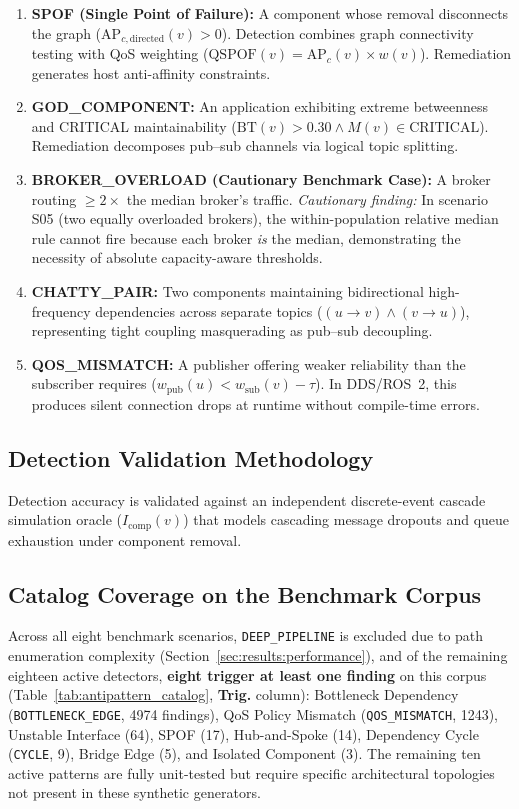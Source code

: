 \begin{enumerate}
    \item \textbf{SPOF (Single Point of Failure):} A component whose removal disconnects the graph ($\mathrm{AP}_{c,\text{directed}}(v) > 0$). Detection combines graph connectivity testing with QoS weighting ($\mathrm{QSPOF}(v) = \mathrm{AP}_c(v) \times w(v)$). Remediation generates host anti-affinity constraints.
    \item \textbf{GOD\_COMPONENT:} An application exhibiting extreme betweenness and CRITICAL maintainability ($\mathrm{BT}(v) > 0.30 \wedge M(v) \in \text{CRITICAL}$). Remediation decomposes pub--sub channels via logical topic splitting.
    \item \textbf{BROKER\_OVERLOAD (Cautionary Benchmark Case):} A broker routing $\ge 2\times$ the median broker's traffic. \emph{Cautionary finding:} In scenario S05 (two equally overloaded brokers), the within-population relative median rule cannot fire because each broker \emph{is} the median, demonstrating the necessity of absolute capacity-aware thresholds.
    \item \textbf{CHATTY\_PAIR:} Two components maintaining bidirectional high-frequency dependencies across separate topics ($(u \to v) \wedge (v \to u)$), representing tight coupling masquerading as pub--sub decoupling.
    \item \textbf{QOS\_MISMATCH:} A publisher offering weaker reliability than the subscriber requires ($w_{\text{pub}}(u) < w_{\text{sub}}(v) - \tau$). In DDS/ROS~2, this produces silent connection drops at runtime without compile-time errors.
\end{enumerate}

\subsection{Detection Validation Methodology}
\label{sec:catalog:validation}

Detection accuracy is validated against an independent discrete-event cascade simulation oracle ($I_{\text{comp}}(v)$) that models cascading message dropouts and queue exhaustion under component removal.

\subsection{Catalog Coverage on the Benchmark Corpus}
\label{sec:catalog:coverage}

Across all eight benchmark scenarios, \texttt{DEEP\_PIPELINE} is excluded due to path enumeration complexity (Section~\ref{sec:results:performance}), and of the remaining eighteen active detectors, \textbf{eight trigger at least one finding} on this corpus (Table~\ref{tab:antipattern_catalog}, \textbf{Trig.} column): Bottleneck Dependency (\texttt{BOTTLENECK\_EDGE}, 4974 findings), QoS Policy Mismatch (\texttt{QOS\_MISMATCH}, 1243), Unstable Interface (64), SPOF (17), Hub-and-Spoke (14), Dependency Cycle (\texttt{CYCLE}, 9), Bridge Edge (5), and Isolated Component (3). The remaining ten active patterns are fully unit-tested but require specific architectural topologies not present in these synthetic generators.

